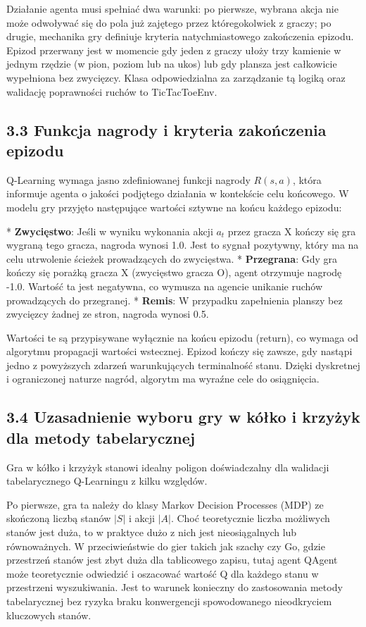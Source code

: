 \documentclass[conference]{IEEEtran}
\begin{document}
Działanie agenta musi spełniać dwa warunki: po pierwsze, wybrana akcja nie może odwoływać się do pola już zajętego przez któregokolwiek z graczy; po drugie, mechanika gry definiuje kryteria natychmiastowego zakończenia epizodu. Epizod przerwany jest w momencie gdy jeden z graczy ułoży trzy kamienie w jednym rzędzie (w pion, poziom lub na ukos) lub gdy plansza jest całkowicie wypełniona bez zwycięzcy. Klasa odpowiedzialna za zarządzanie tą logiką oraz walidację poprawności ruchów to TicTacToeEnv.

\subsection{3.3 Funkcja nagrody i kryteria zakończenia epizodu}
Q-Learning wymaga jasno zdefiniowanej funkcji nagrody $R(s, a)$, która informuje agenta o jakości podjętego działania w kontekście celu końcowego. W modelu gry przyjęto następujące wartości sztywne na końcu każdego epizodu:

*   \textbf{Zwycięstwo}: Jeśli w wyniku wykonania akcji $a_t$ przez gracza X kończy się gra wygraną tego gracza, nagroda wynosi 1.0. Jest to sygnał pozytywny, który ma na celu utrwolenie ścieżek prowadzących do zwycięstwa.
*   \textbf{Przegrana}: Gdy gra kończy się porażką gracza X (zwycięstwo gracza O), agent otrzymuje nagrodę -1.0. Wartość ta jest negatywna, co wymusza na agencie unikanie ruchów prowadzących do przegranej.
*   \textbf{Remis}: W przypadku zapełnienia planszy bez zwycięzcy żadnej ze stron, nagroda wynosi 0.5.

Wartości te są przypisywane wyłącznie na końcu epizodu (return), co wymaga od algorytmu propagacji wartości wstecznej. Epizod kończy się zawsze, gdy nastąpi jedno z powyższych zdarzeń warunkujących terminalność stanu. Dzięki dyskretnej i ograniczonej naturze nagród, algorytm ma wyraźne cele do osiągnięcia.

\subsection{3.4 Uzasadnienie wyboru gry w kółko i krzyżyk dla metody tabelarycznej}
Gra w kółko i krzyżyk stanowi idealny poligon doświadczalny dla walidacji tabelarycznego Q-Learningu z kilku względów.

Po pierwsze, gra ta należy do klasy Markov Decision Processes (MDP) ze skończoną liczbą stanów $|S|$ i akcji $|A|$. Choć teoretycznie liczba możliwych stanów jest duża, to w praktyce dużo z nich jest nieosiągalnych lub równoważnych. W przeciwieństwie do gier takich jak szachy czy Go, gdzie przestrzeń stanów jest zbyt duża dla tablicowego zapisu, tutaj agent QAgent może teoretycznie odwiedzić i oszacować wartość Q dla każdego stanu w przestrzeni wyszukiwania. Jest to warunek konieczny do zastosowania metody tabelarycznej bez ryzyka braku konwergencji spowodowanego nieodkryciem kluczowych stanów.
\end{document}
